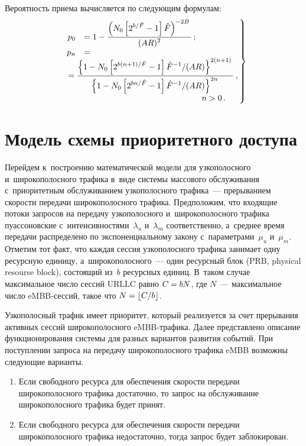 \begin{multicols}{2}
  Вероятность приема вычисляется по сле\-ду\-ющим формулам:
  \begin{equation}
  \left.
  \begin{array}{rl}
  p_0 &= 1-\fr{\left( N_0\left[ 2^{b/\hat{F}}-1\right] \hat{F}  
\right)^{-2B}}{(AR)^2}\,;\\[6pt]
  p_n&={}\\
  &\hspace*{-22pt}{}= \fr{\left\{ 1-N_0 \left[ 2^{b(n+1)/\hat{F}}-1\right]\hat{F}^{-1}/(AR)
  \right\}^{2(n+1)}}
  { \left\{ 1-
   N_0\left[ 2^{bn/\hat{F}}-1\right]\hat{F}^{-1}/(AR)\right\}^{2n}}\,,\\[6pt] 
&\hspace*{50mm}n>0\,.
  \end{array}\!\!
  \right\}\!
  \label{e6-koc}
  \end{equation}

\section{Модель схемы приоритетного доступа}
 
  Перейдем к~построению математической модели для узкополосного 
и~широкополосного трафика в~виде системы массового обслуживания 
с~приоритетным обслуживанием узкополосного трафика~--- прерыванием 
скорости передачи широкополосного трафика. Предположим, что входящие 
потоки запросов на передачу узкополосного и~широкополосного трафика 
пуассоновские с~интенсивностями~$\lambda_u$ и~$\lambda_m$ соответственно, 
а~среднее время передачи распределено по экспоненциальному закону 
с~параметрами~$\mu_u$ и~$\mu_m$. Отметим тот факт, что каж\-дая сессия 
узкополосного трафика занимает одну ресурсную единицу, 
а~широкополосного~--- один ресурсный блок (PRB, physical resourse block), состоящий из~$b$ 
ресурсных единиц. В~таком случае максимальное число сессий URLLC равно 
$C\hm= bN$, где $N$~--- максимальное число eMBB-сес\-сий, такое что 
$N\hm= \lfloor C/b\rfloor$. 
  
  Узкополосный трафик имеет приоритет, который реализуется за счет 
прерывания активных сессий широкополосного eMBB-тра\-фи\-ка. Далее 
представлено описание функционирования системы для разных вариантов 
развития событий. При поступлении запроса на передачу широкополосного 
трафика eMBB возможны сле\-ду\-ющие варианты.
  \begin{enumerate}[1.]
\item Если свободного ресурса для обеспечения скорости передачи 
широкополосного трафика достаточно, то запрос на обслуживание 
широкополосного трафика будет принят.
\item Если свободного ресурса для обеспечения скорости передачи 
широкополосного трафика недостаточно, тогда запрос будет заблокирован.
\end{enumerate}


\end{multicols}
